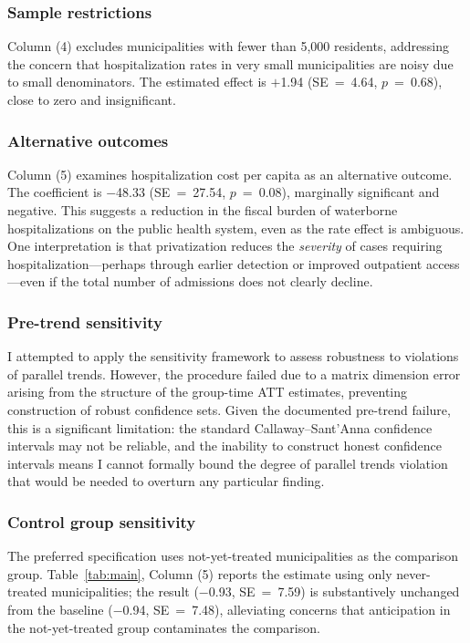 \documentclass[12pt]{article}
\begin{document}
\subsubsection*{Sample restrictions} Column (4) excludes municipalities with fewer than 5,000 residents, addressing the concern that hospitalization rates in very small municipalities are noisy due to small denominators. The estimated effect is $+$1.94 (SE~=~4.64, $p$~=~0.68), close to zero and insignificant.

\subsubsection*{Alternative outcomes} Column (5) examines hospitalization cost per capita as an alternative outcome. The coefficient is $-$48.33 (SE~=~27.54, $p$~=~0.08), marginally significant and negative. This suggests a reduction in the fiscal burden of waterborne hospitalizations on the public health system, even as the rate effect is ambiguous. One interpretation is that privatization reduces the \textit{severity} of cases requiring hospitalization---perhaps through earlier detection or improved outpatient access---even if the total number of admissions does not clearly decline.

\subsubsection*{Pre-trend sensitivity} I attempted to apply the \citet{rambachan2023honest} sensitivity framework to assess robustness to violations of parallel trends. However, the procedure failed due to a matrix dimension error arising from the structure of the group-time ATT estimates, preventing construction of robust confidence sets. Given the documented pre-trend failure, this is a significant limitation: the standard Callaway--Sant'Anna confidence intervals may not be reliable, and the inability to construct honest confidence intervals means I cannot formally bound the degree of parallel trends violation that would be needed to overturn any particular finding.

\subsubsection*{Control group sensitivity} The preferred specification uses not-yet-treated municipalities as the comparison group. Table~\ref{tab:main}, Column (5) reports the estimate using only never-treated municipalities; the result ($-$0.93, SE~=~7.59) is substantively unchanged from the baseline ($-$0.94, SE~=~7.48), alleviating concerns that anticipation in the not-yet-treated group contaminates the comparison.
\end{document}
